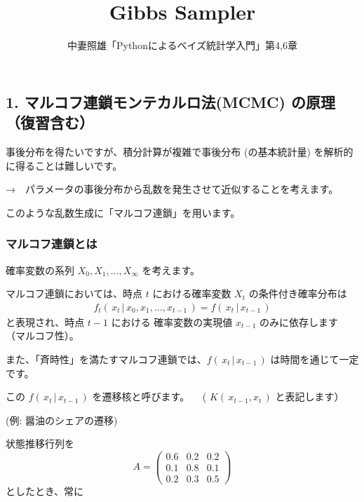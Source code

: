 \documentclass[
]{article}
\title{Gibbs Sampler}
\subtitle{中妻照雄「Pythonによるベイズ統計学入門」第4,6章}
\author{}
\date{\vspace{-2.5em}}
\begin{document}
\maketitle

{
\setcounter{tocdepth}{3}
\tableofcontents
}
\hypertarget{ux30deux30ebux30b3ux30d5ux9023ux9396ux30e2ux30f3ux30c6ux30abux30ebux30edux6cd5mcmc-ux306eux539fux7406ux5fa9ux7fd2ux542bux3080}{%
\subsection{\texorpdfstring{\textbf{1. マルコフ連鎖モンテカルロ法(MCMC)
の原理（復習含む）}}{1. マルコフ連鎖モンテカルロ法(MCMC) の原理（復習含む）}}\label{ux30deux30ebux30b3ux30d5ux9023ux9396ux30e2ux30f3ux30c6ux30abux30ebux30edux6cd5mcmc-ux306eux539fux7406ux5fa9ux7fd2ux542bux3080}}

事後分布を得たいですが、積分計算が複雑で事後分布 (の基本統計量)
を解析的に得ることは難しいです。

→　パラメータの事後分布から乱数を発生させて近似することを考えます。

このような乱数生成に「マルコフ連鎖」を用います。

\hypertarget{ux30deux30ebux30b3ux30d5ux9023ux9396ux3068ux306f}{%
\subsubsection{\texorpdfstring{\textbf{マルコフ連鎖とは}}{マルコフ連鎖とは}}\label{ux30deux30ebux30b3ux30d5ux9023ux9396ux3068ux306f}}

確率変数の系列 \(X_0,X_1, ... , X_\infty\) を考えます。

マルコフ連鎖においては、時点 \(t\) における確率変数 \(X_t\)
の条件付き確率分布は \[
\begin{eqnarray}
f_t(\,x_t\,|\,x_0,x_1,...,x_{t-1}\,) = f(\,x_t\,|\,x_{t-1}\,)
\end{eqnarray}
\] と表現され、時点 \(t-1\) における 確率変数の実現値 \(x_{t-1}\)
のみに依存します （マルコフ性）。

また、「斉時性」を満たすマルコフ連鎖では、\(f(\,x_t\,|\,x_{t-1}\,)\)
は時間を通じて一定です。

この \(f(\,x_t\,|\,x_{t-1}\,)\) を遷移核と呼びます。  (
\(K(\,x_{t-1},x_t\,)\) と表記します）

(例: 醤油のシェアの遷移)

状態推移行列を \[
A =
\begin{pmatrix}
0.6 & 0.2 & 0.2 \\
0.1 & 0.8 & 0.1\\
0.2 & 0.3 & 0.5
\end{pmatrix}
\] としたとき、常に
\end{document}
